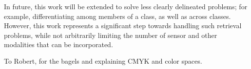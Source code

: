 \documentclass[sigconf,natbib=true,anonymous=true]{acmart}
\begin{document}
In future, this work will be extended to solve less clearly delineated problems; for example, differentiating among members of a class, as well as across classes. However, this work represents a significant step towards handling such retrieval problems, while not arbitrarily limiting the number of sensor and other modalities that can be incorporated. 





\begin{acks}
To Robert, for the bagels and explaining CMYK and color spaces.
\end{acks}



\clearpage
\clearpage



\appendix
\label{sec:appendix}
\end{document}

